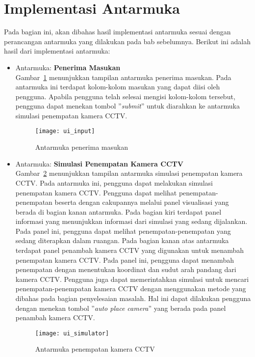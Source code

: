\section{Implementasi Antarmuka}
Pada bagian ini, akan dibahas hasil implementasi antarmuka sesuai dengan perancangan antarmuka yang dilakukan pada bab sebelumnya. Berikut ini adalah hasil dari implementasi antarmuka:
\begin{itemize}
	\item Antarmuka: \textbf{Penerima Masukan}\\
	Gambar~\ref{fig:ui_input} menunjukkan tampilan antarmuka penerima masukan. Pada antarmuka ini terdapat kolom-kolom masukan yang dapat diisi oleh pengguna. Apabila pengguna telah selesai mengisi kolom-kolom tersebut, pengguna dapat menekan tombol ''\textit{submit}'' untuk diarahkan ke antarmuka simulasi penempatan kamera CCTV.
	\begin{figure}[H]
		\centering  
		\texttt{[image: ui\_input]}
		\caption[Antarmuka penerima masukan]{Antarmuka penerima masukan}
		\label{fig:ui_input}
	\end{figure}
	
	\item Antarmuka: \textbf{Simulasi Penempatan Kamera CCTV}\\
	Gambar~\ref{fig:ui_simulator} menunjukkan tampilan antarmuka simulasi penempatan kamera CCTV. Pada antarmuka ini, pengguna dapat melakukan simulasi penempatan kamera CCTV. Pengguna dapat melihat penempatan-penempatan beserta dengan cakupannya melalui panel visualisasi yang berada di bagian kanan antarmuka. Pada bagian kiri terdapat panel informasi yang menunjukkan informasi dari simulasi yang sedang dijalankan. Pada panel ini, pengguna dapat melihat penempatan-penempatan yang sedang diterapkan dalam ruangan. Pada bagian kanan atas antarmuka terdapat panel penambah kamera CCTV yang digunakan untuk menambah penempatan kamera CCTV. Pada panel ini, pengguna dapat menambah penempatan dengan menentukan koordinat dan sudut arah pandang dari kamera CCTV. Pengguna juga dapat memerintahkan simulasi untuk mencari penempatan-penempatan kamera CCTV dengan menggunakan metode yang dibahas pada bagian penyelesaian masalah. Hal ini dapat dilakukan pengguna dengan menekan tombol ''\textit{auto place camera}'' yang berada pada panel penambah kamera CCTV.
	\begin{figure}[H]
		\centering  
		\texttt{[image: ui\_simulator]}
		\caption[Antarmuka penempatan kamera CCTV]{Antarmuka penempatan kamera CCTV}
		\label{fig:ui_simulator}
	\end{figure}
\end{itemize}

